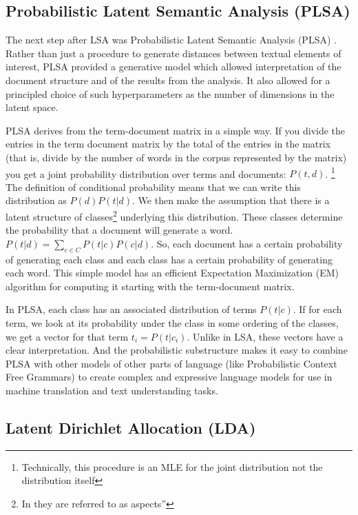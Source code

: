 \subsection{Probabilistic Latent Semantic Analysis (PLSA)}

The next step after LSA was Probabilistic Latent Semantic Analysis (PLSA) 
\citep{Hofmann1999}. Rather than just a 
procedure to generate distances between textual elements of interest, PLSA 
provided a generative model which allowed interpretation of the document 
structure and of the results from the analysis. It also allowed for a principled
choice of such hyperparameters as the number of dimensions in the latent space.

PLSA derives from the term-document matrix in a simple way. If you divide the
entries in the term document matrix by the total of the entries in the matrix
(that is, divide by the number of words in the corpus represented by the matrix)
you get a joint probability distribution over terms and documents: $P(t,d)$.
\footnote{Technically, this procedure is an MLE for the joint distribution 
not the distribution itself} The definition of conditional probability means 
that we can write this distribution as $P(d)P(t|d)$. We then make the 
assumption that there is a latent structure of 
classes\footnote{In \citep{Hofmann1999} they are referred to as 
aspects''} underlying this distribution. These classes determine the 
probability that a document will generate a word. 
$P(t|d)=\sum_{c\in C}P(t|c)P(c|d)$. So, each document has a certain probability
of generating each class and each class has a certain probability of generating
each word. This simple model has an efficient Expectation Maximization (EM) 
algorithm for computing it starting with the term-document matrix.

In PLSA, each class has an associated distribution of terms $P(t|c)$. If for 
each term, we look at its probability under the class in some ordering of the 
classes, we get a vector for that term $t_i = P(t|c_i)$. Unlike in LSA, these
vectors have a clear interpretation. And the probabilistic substructure makes
it easy to combine PLSA with other models of other parts of language (like 
Probabilistic Context Free Grammars) to create complex and expressive language
models for use in machine translation and text understanding tasks.

\subsection{Latent Dirichlet Allocation (LDA)}

